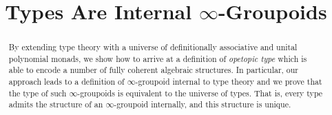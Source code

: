 \documentclass[conference,10pt]{IEEEtran}
\begin{document}
\setlength{\abovedisplayskip}{6pt}
\setlength{\belowdisplayskip}{6pt}

\title{Types Are Internal $\infty$-Groupoids}
\author{
  \and
  \and
}

\IEEEoverridecommandlockouts
{}
\maketitle

\begin{abstract}
  By extending type theory with a universe of definitionally
  associative and unital polynomial monads, we show how to arrive at a
  definition of \emph{opetopic type} which is able to encode a number
  of fully coherent algebraic structures.  In particular, our approach
  leads to a definition of $\infty$-groupoid internal to type theory
  and we prove that the type of such $\infty$-groupoids is equivalent
  to the universe of types.  That is, every type admits the structure
  of an $\infty$-groupoid internally, and this structure is unique.
\end{abstract}

%
\IEEEpeerreviewmaketitle










\end{document}
